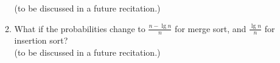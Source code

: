 \documentclass[letterpaper,11pt]{article}
\begin{document}
\begin{enumerate}
\begin{enumerate}
(to be discussed in a future recitation.)\\

\item What if the probabilities change to $\frac{n-\lg n}{n}$ for merge sort, and $\frac{\lg n}{n}$ for insertion sort?\\

(to be discussed in a future recitation.)\\
\end{enumerate}

\end{enumerate}
\end{document}
